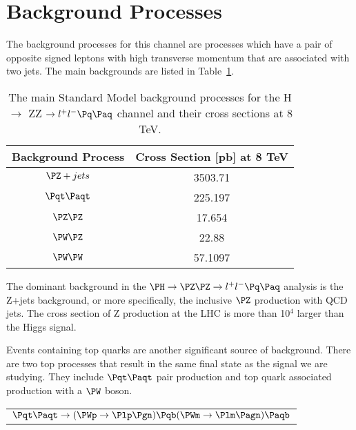 \section{Background Processes}

The background processes for this channel are processes which have a pair of opposite signed leptons with high transverse momentum that are associated with two jets.  The main backgrounds are listed in Table~\ref{tab:background_2l2q}.

\begin{table}[htb]
\caption{%
  The main Standard Model background processes for the H $\rightarrow$ ZZ $\rightarrow l^{+}l^{-} \Pq \Paq$ channel and their cross sections at 8 TeV.
}
\begin{center}
  \begin{tabular}{ | c | c |} \hline
    Background Process & Cross Section [pb] at 8 TeV\\ \hline \hline
    $\PZ + jets$ & 3503.71 \\ \hline
    $\Pqt \Paqt$ & 225.197\\ \hline
    $\PZ \PZ$    & 17.654 \\ \hline
    $\PW \PZ$    & 22.88 \\ \hline
    $\PW \PW$    & 57.1097\\ \hline
  \end{tabular}
\end{center}
\label{tab:background_2l2q}
\end{table}

The dominant background in the  $\PH \rightarrow \PZ\PZ \rightarrow l^{+}l^{-} \Pq \Paq$ analysis is the Z+jets background, or more specifically, the inclusive $\PZ$ production with QCD jets.  The cross section of Z production at the LHC is more than 10$^{4}$ larger than the Higgs signal.

Events containing top quarks are another significant source of background.  There are two top processes that result in the same final state as the signal we are studying.  They include $\Pqt \Paqt$ pair production and top quark associated production with a $\PW$ boson.
\begin{center}
  \begin{tabular}{ c }
    $\Pqt \Paqt  \rightarrow (\PWp \rightarrow \Plp\Pgn)\Pqb (\PWm \rightarrow \Plm\Pagn)\Paqb           $
  \end{tabular}
\end{center}

